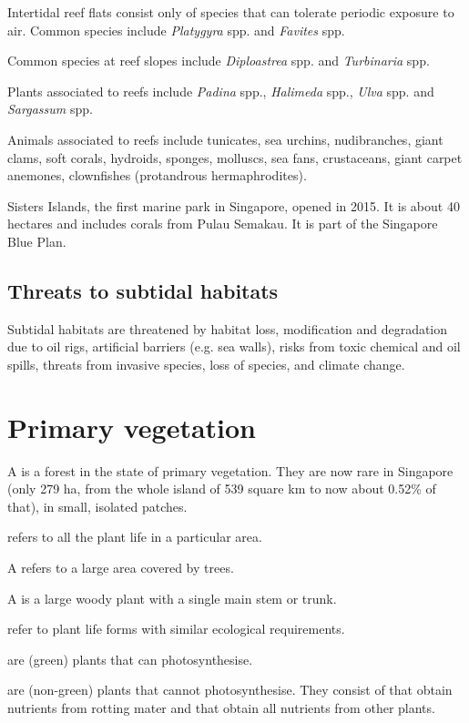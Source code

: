 \documentclass{slnotes}
\newcommand{\scn}[1]{\textit{#1}}
\begin{document}
Intertidal reef flats consist only of species that can tolerate periodic exposure to air. Common species include \scn{Platygyra} spp. and \scn{Favites} spp.

Common species at reef slopes include \scn{Diploastrea} spp. and \scn{Turbinaria} spp.

Plants associated to reefs include \scn{Padina} spp., \scn{Halimeda} spp., \scn{Ulva} spp. and \scn{Sargassum} spp.

Animals associated to reefs include tunicates, sea urchins, nudibranches, giant clams, soft corals, hydroids, sponges, molluscs, sea fans, crustaceans, giant carpet anemones, clownfishes (protandrous hermaphrodites).

Sisters Islands, the first marine park in Singapore, opened in 2015. It is about 40 hectares and includes corals from Pulau Semakau. It is part of the Singapore Blue Plan.
\section{Threats to subtidal habitats}
Subtidal habitats are threatened by habitat loss, modification and degradation due to oil rigs, artificial barriers (e.g. sea walls), risks from toxic chemical and oil spills, threats from invasive species, loss of species, and climate change.
\chapter{Primary vegetation}
A  is a forest in the state of primary vegetation. They are now rare in Singapore (only 279 ha, from the whole island of 539 square km to now about 0.52\% of that), in small, isolated patches.

 refers to all the plant life in a particular area.

A  refers to a large area covered by trees.

A  is a large woody plant with a single main stem or trunk.

 refer to plant life forms with similar ecological requirements.

 are (green) plants that can photosynthesise.

 are (non-green) plants that cannot photosynthesise. They consist of  that obtain nutrients from rotting mater and  that obtain all nutrients from other plants.
\end{document}
